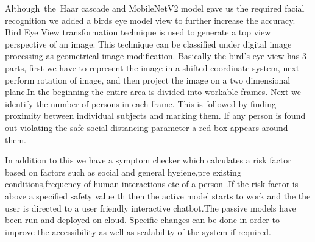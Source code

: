 \documentclass[12pt]{article}
\begin{document}
\begin{justify}
Although\ the\ Haar cascade and MobileNetV2 model gave us the required facial recognition we added a birds eye model view to further increase the accuracy. Bird Eye View transformation technique is used  to generate a top view perspective of an image. This technique can be classified under digital image processing as geometrical image modification. Basically the bird’s eye view has 3 parts, first we have to represent the image in a shifted coordinate system, next perform rotation of image, and then project the image on a two dimensional plane.In the beginning the entire area is divided into  workable frames. Next we identify the number of persons in each frame. This is followed by finding proximity between individual subjects and marking them. If any person is found out violating the safe social distancing parameter a red box appears around them.
\end{justify}

\vspace{\baselineskip}
\setlength{\parskip}{9.96pt}
\begin{justify}
In addition to this we have a symptom checker which calculates a risk factor based on factors such as social and general hygiene,pre existing conditions,frequency of human interactions etc of a person .If the risk factor is above a specified safety value th then the active model starts to work and the the user is directed to a user friendly interactive chatbot.The passive models have been run and deployed on cloud. Specific changes can be done in order to improve the accessibility as well as scalability of the system if required.
\end{justify}

\vspace{\baselineskip}
\setlength{\parskip}{0.0pt}
\setlength{\parskip}{9.96pt}
\setlength{\parskip}{0.0pt}
\vspace{\baselineskip}
\vspace{\baselineskip}
\vspace{\baselineskip}
\vspace{\baselineskip}
\vspace{\baselineskip}
\end{document}
